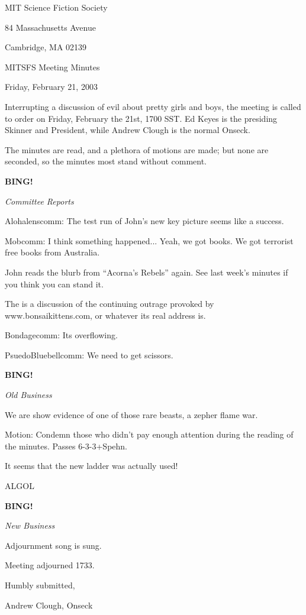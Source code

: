 \documentclass[12pt]{article}
\newcommand{\bing}{{\bf BING!} }
\newcommand{\goto}[1]{\bing \vskip 12pt \centerline{{\em{#1}}}}
\begin{document}
\begin{center}

MIT Science Fiction Society 

84 Massachusetts Avenue

Cambridge, MA 02139

\vspace{12pt}

MITSFS Meeting Minutes 

Friday, February 21, 2003

\end{center}
 
\vspace{18pt}

\setlength{\parskip}{6pt}

\noindent
Interrupting a discussion of evil about pretty girls and boys, the meeting is called to order on Friday, February the 21st, 1700 SST.  Ed Keyes is the presiding Skinner and President, while Andrew Clough is the normal Onseck.

The minutes are read, and a plethora of motions are made; but none are seconded, so the minutes most stand without comment.

\goto{Committee Reports}

Alohalenscomm:  The test run of John's new key picture seems like a success.

Mobcomm:  I think something happened...  Yeah, we got books.  We got terrorist free books from Australia.

John reads the blurb from ``Acorna's Rebels'' again. See last week's minutes if you think you can  stand it.

The is a discussion of the continuing outrage provoked by www.bonsaikittens.com, or whatever its real address is.

Bondagecomm:  Its overflowing.

PsuedoBluebellcomm:  We need to get scissors.

\goto{Old Business}

We are show evidence of one of those rare beasts, a zepher flame war.

Motion:  Condemn those who didn't pay enough attention during the reading of the minutes.  Passes 6-3-3+Spehn.

It seems that the new ladder was actually used!

ALGOL

\goto{New Business}

Adjournment song is sung.
\vspace{12pt}

\noindent
Meeting adjourned 1733.

\vspace{18pt}

\centerline{Humbly submitted,}
\centerline{Andrew Clough, Onseck}
\end{document}
